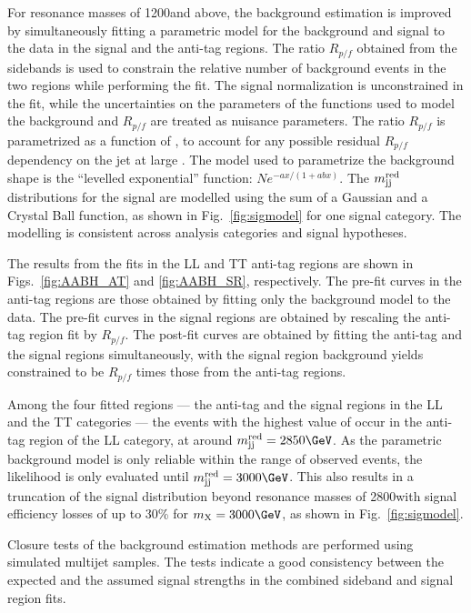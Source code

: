 For resonance masses of 1200\GeV and above, the background estimation is
improved by simultaneously fitting a parametric model for the
background and signal to the data in the signal and the anti-tag
regions. The ratio $R_{p/f}$ obtained from the sidebands is used to
constrain the relative number of background events in the two regions
while performing the fit. The signal normalization is unconstrained in
the fit, while the uncertainties on the parameters of the functions
used to model the background and $R_{p/f}$ are treated as nuisance
parameters.
The ratio $R_{p/f}$
is parametrized as a function of \mjjs, to account for any possible
residual $R_{p/f}$ dependency on the jet \pt at large \mjjs. The model
used to parametrize the background shape is the ``levelled
exponential'' function: $N e^{-ax/(1+a b x )}$.
The $m_{\text{jj}}^{\text{red}}$ distributions for the signal are modelled using the sum of
a Gaussian and a Crystal Ball function, as shown in
Fig.~\ref{fig:sigmodel} for one signal category. The modelling is
consistent across analysis categories and signal hypotheses.

The results from the fits in the LL and TT anti-tag regions are shown in Figs.~\ref{fig:AABH_AT} and \ref{fig:AABH_SR}, respectively. The pre-fit curves in the anti-tag regions are those obtained by fitting only the background model to the data. The pre-fit curves in the signal regions are obtained by rescaling the anti-tag region fit by $R_{p/f}$. The post-fit curves are obtained by fitting the anti-tag and the signal regions simultaneously, with the signal region background yields constrained to be $R_{p/f}$ times those from the anti-tag regions. 

Among the four fitted regions --- the anti-tag and the signal regions in the
LL and the TT categories --- the events with the highest value of \mjjs
occur in the anti-tag region of the LL category, at around
$\mjjs = 2850\GeV$.
As the parametric background model is only reliable within the range
of observed events, the likelihood is only evaluated until $\mjjs = 3000\GeV$.
This also results in a truncation of the signal
distribution beyond resonance masses of 2800\GeV with signal
efficiency losses of up to 30\% for $\mx = 3000\GeV$, as shown in
Fig.~\ref{fig:sigmodel}.
    
Closure tests of the background estimation methods are performed
using simulated multijet samples. The tests indicate a good
consistency between the expected and the assumed signal strengths in the
combined sideband and signal region fits.


